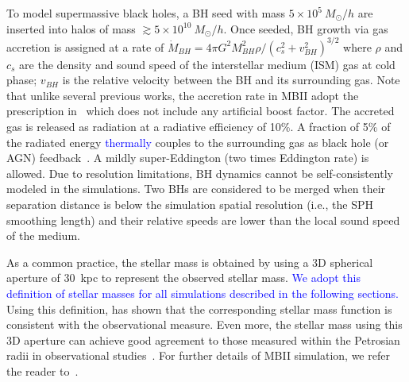 \documentclass[twocolumn]{aastex631}
\newcommand{\ding}[1]{\textcolor{red}{[{\bf Xuheng}: #1]}}
\newcommand{\blue}[1]{\textcolor{blue}{#1}}
\newcommand{\aklant}[1]{\textcolor{blue}{#1}}
\begin{document}
To model supermassive black holes, a BH seed with mass $5\times 10^{5}~M_{\odot}/h$ are inserted into halos of mass $\gtrsim 5\times 10^{10}~M_{\odot}/h$. Once seeded, BH growth via gas accretion is assigned at a rate of $\dot{M}_{BH}={4\pi G^2 M_{BH}^2 \rho}/{(c_s^2+v_{BH}^2)^{3/2}}$ where $\rho$ and $c_s$ are the density and sound speed of the interstellar medium (ISM) gas at cold phase; $v_{BH}$ is the relative velocity between the BH and its surrounding gas. Note that unlike several previous works, the accretion rate in MBII adopt the prescription in~\citet{Pelupessy2007} which does not include any artificial boost factor. The accreted gas is released as radiation at a radiative efficiency of 10\%. A fraction of 5\% of the radiated energy \aklant{thermally} couples to the surrounding gas as black hole (or AGN) feedback~\citep{2005Natur.433..604D}. A mildly super-Eddington (two times Eddington rate) is allowed. Due to resolution limitations, BH dynamics cannot be self-consistently modeled in the simulations. Two BHs are considered to be merged when their separation distance is below the simulation spatial resolution (i.e., the SPH smoothing length) and their relative speeds are lower than the local sound speed of the medium.


As a common practice, the stellar mass is obtained by using a 3D spherical aperture of 30~kpc to represent the observed stellar mass. \blue{We adopt this definition of stellar masses for all simulations described in the following sections.} Using this definition, \citet{Pillepich2018} has shown that the corresponding stellar mass function is consistent with the observational measure. Even more, the stellar mass using this 3D aperture can achieve good agreement to those measured within the Petrosian radii in observational studies~\citep{Schaye2015}. For further details of MBII simulation, we refer the reader to~\citet{Khandai2015}.
\end{document}
